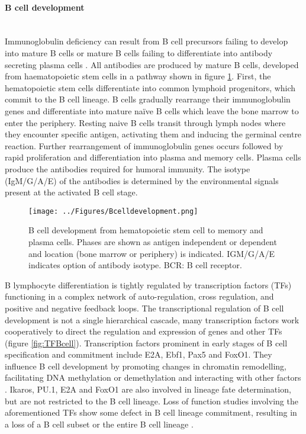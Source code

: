 \documentclass[12pt]{article}
\newcommand{\naive}{na\"{i}ve }
\begin{document}
		\paragraph{B cell development}
			~\\
			Immunoglobulin deficiency can result from B cell precursors failing to develop into mature B cells or mature B cells failing to differentiate into antibody secreting plasma cells \citep{Fiorilli86}. 
			All antibodies are produced by mature B cells, developed from haematopoietic stem cells in a pathway shown in figure \ref{fig:BCellDevelopment}.
			First, the hematopoietic stem cells differentiate into common lymphoid progenitors, which commit to the B cell lineage.
			B cells gradually rearrange their immunoglobulin genes and differentiate into mature \naive B cells which leave the bone marrow to enter the periphery. 
			Resting naive B cells transit through lymph nodes where they encounter specific antigen, activating them and inducing the germinal centre reaction. 
			Further rearrangement of immunoglobulin genes occurs followed by rapid proliferation and differentiation into plasma and memory cells. 
			Plasma cells produce the antibodies required for humoral immunity. 
			The isotype (IgM/G/A/E) of the antibodies is determined by the environmental signals present at the activated B cell stage. 
			
			
			\begin{figure}[tb]
				\centering
				\texttt{[image: ../Figures/Bcelldevelopment.png]}
				\caption{B cell development from hematopoietic stem cell to memory and plasma cells. Phases are shown as antigen independent or dependent and location (bone marrow or periphery) is indicated. IGM/G/A/E indicates option of antibody isotype. BCR: B cell receptor.}
				\label{fig:BCellDevelopment}
			\end{figure}
			
			B lymphocyte differentiation is tightly regulated by transcription factors (TFs) functioning in a complex network of auto-regulation, cross regulation, and positive and negative feedback loops.
			The transcriptional regulation of B cell development is not a single hierarchical cascade, many transcription factors work cooperatively to direct the regulation and expression of genes and other TFs (figure \ref{fig:TFBcell}). 
			Transcription factors prominent in early stages of B cell specification and commitment include E2A, Ebf1, Pax5 and FoxO1. 
			They influence B cell development by promoting changes in chromatin remodelling, facilitating DNA methylation or demethylation and interacting with other factors \citep{Gao09,Maier04,Walter08,Decker09,Lin10,McManus11,Treiber10,Zandi00}. 
			Ikaros, PU.1, E2A and FoxO1 are also involved in lineage fate determination, but are not restricted to the B cell lineage.
			Loss of function studies involving the aforementioned TFs show some defect in B cell lineage commitment, resulting in a loss of a B cell subset or the entire B cell lineage \citep{Choukrallah14}.
\end{document}
